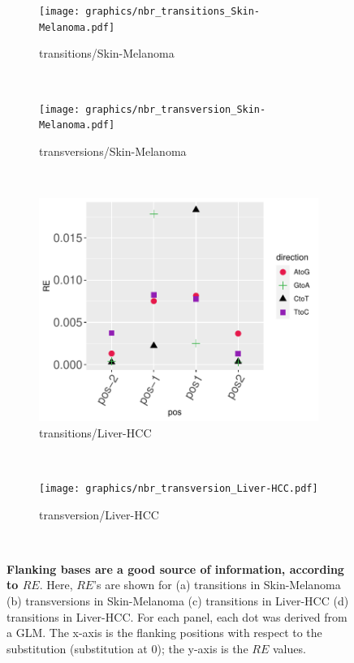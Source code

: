 \begin{figure}[ht!]
    \begin{subfigure}{.5\textwidth}
    \texttt{[image: graphics/nbr\_transitions\_Skin-Melanoma.pdf]}
    \caption{transitions/Skin-Melanoma}
    \label{fig:transitions_skin}
    \end{subfigure}
    ~
    \begin{subfigure}{.5\textwidth}
    \texttt{[image: graphics/nbr\_transversion\_Skin-Melanoma.pdf]}
    \caption{transversions/Skin-Melanoma}
    \label{fig:transversions_skin}
    \end{subfigure} \\
    \vspace{0.5cm}
    
    \begin{subfigure}{.5\textwidth}
    \includegraphics[scale=0.63]{graphics/nbr_transitions_Liver-HCC.pdf}
    \caption{transitions/Liver-HCC}
    \label{fig:transitions_liver}
    \end{subfigure}
    ~
    \begin{subfigure}{.5\textwidth}
    \texttt{[image: graphics/nbr\_transversion\_Liver-HCC.pdf]}
    \caption{transversion/Liver-HCC}
    \label{fig:transversion_liver}
    \end{subfigure} \\
    
    \caption{\textbf{Flanking bases are a good source of information, according to $RE$}. Here, $RE$'s are shown for (a) transitions in Skin-Melanoma (b) transversions in Skin-Melanoma (c) transitions in Liver-HCC (d) transitions in Liver-HCC. For each panel, each dot was derived from a GLM. The x-axis is the flanking positions with respect to the substitution (substitution at 0); the y-axis is the $RE$ values.}
    \label{fig:nbr}
\end{figure}